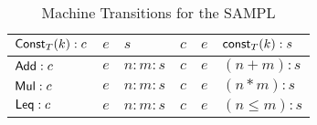 \documentclass[11pt]{article}
\newcommand{\<}{\langle}
\renewcommand{\>}{\rangle}
\begin{document}
\begin{table}
\begin{center}
\begin{tabular}{|l|l|l||l|l|l|}
     ${\sf Const}_T(k):c $ & $e$    & $s$      
                     & $c$           &$ e$    & ${\sf const}_T(k):s$    \\ \hline      
     ${\sf Add}:c$         & $e$    & $n:m:s$      
                     & $c $          & $e$    & $(n+m):s$    \\ \hline                  
     ${\sf Mul}:c$         & $e$    & $n:m:s$      
                     & $c $          & $e$    & $(n*m):s$    \\ \hline 
     ${\sf Leq}:c$         & $e$    & $n:m:s$      
                     & $c $          & $e$    & $(n \leq m):s$    \\ \hline  
   \end{tabular}
\caption{Machine Transitions for the SAMPL}
\label{TranTable}
\end{center}
\end{table}
\end{document}
